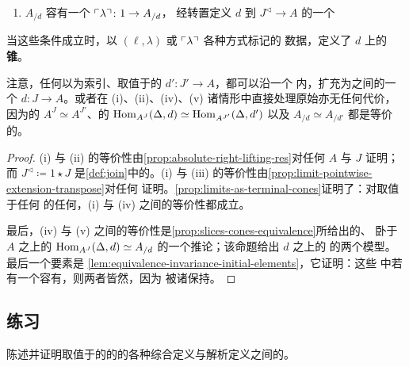 \begin{proposition}
\begin{enumerate}[label=(\roman*)]
$\rvTranspose{\lambda}\colon 1\to\Hom_{A^{J}}(\Delta,d)$，表示\trCone
$\lambda\colon\Delta\ell\Rightarrow d$。
\par\endgroup
\item \trQuasiCategory{} $A_{/d}$ 容有一个\trTerminal{}\trElement{} $\ulcorner \lambda\urcorner\colon 1\to A_{/d}$，
经转置定义 $d$ 到\trDiagram{} $J^{\triangleleft}\to A$ 的一个\trExtension
\begin{center}
\end{center}
\end{enumerate}
\end{proposition}

当这些条件成立时，以 $(\ell,\lambda)$ 或 $\ulcorner \lambda\urcorner$ 各种方式标记的
数据，定义了 $d$ 上的\textbf{\trLimit{}锥}。

注意，任何以\trSimplicialSet{}为索引、取值于\trQuasiCategory{}的\trDiagram{} $d'\colon J'\to A$，都可以沿一个
内\trAnodyneExtension，扩充为\trQuasiCategory{}之间的一个\trWeakEquivalence{}\trDiagram{} $d\colon J\to A$。或者在
(i)、(ii)、(iv)、(v) 诸情形中直接处理原始\trDiagram{}亦无任何代价，因为\trDiagram{}的\trQuasiCategory
$A^{J}\simeq A^{J'}$、\trCone{}的\trQuasiCategory{} $\operatorname{Hom}_{A^{J}}(\Delta,d)\simeq\operatorname{Hom}_{A^{J'}}(\Delta,d')$ 以及 $A_{/d}\simeq A_{/d'}$ 都是等价的。

\begin{proof}
(i) 与 (ii) 的等价性由\cref{prop:absolute-right-lifting-res}对任何%
\trInfinityCategory{} $A$ 与\trSimplicialSet{} $J$ 证明；而%
\trSimplicialSet{} $J^{\triangleleft}\coloneqq 1\star J$ 是\cref{def:join}中的\trJoin。(i) 与 (iii)
的等价性由\cref{prop:limit-pointwise-extension-transpose}对任何%
\trCartesianClosed{}\trInfinityCosmos{}证明。\cref{prop:limits-as-terminal-cones}证明了：对取值于任何%
\trInfinityCategory{}的任何\trDiagram{}，(i) 与 (iv) 之间的等价性都成立。

最后，(iv) 与 (v) 之间的等价性是\cref{prop:slices-cones-equivalence}所给出的、
卧于 $A$ 之上的\trQuasiCategory\trEquivalence{}
$\operatorname{Hom}_{A^{J}}(\Delta,d)\simeq A_{/d}$ 的一个推论；该命题给出 $d$ 之上\trCone{}的%
\trQuasiCategory{}的两个模型。最后一个要素是%
\cref{lem:equivalence-invariance-initial-elements}，它证明：这些%
\trQuasiCategory{}中若有一个容有\trTerminal{}\trElement{}，则两者皆然，因为%
\trTerminal{}\trElement{}被诸\trEquivalence{}保持。
\end{proof}

\subsection*{练习}

\begin{exercise}\label{ex:colimit-equivalences}
陈述并证明取值于\trQuasiCategory{}的\trDiagram{}的\trColimit{}的各种综合定义与解析定义之间的\trEquivalence。
\end{exercise}

